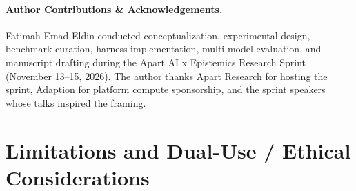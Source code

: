 \documentclass[10pt,a4paper]{article}
\begin{document}
\paragraph{Author Contributions \& Acknowledgements.}
Fatimah Emad Eldin conducted conceptualization, experimental design, benchmark curation, harness implementation, multi-model evaluation, and manuscript drafting during the Apart AI x Epistemics Research Sprint (November 13--15, 2026). The author thanks Apart Research for hosting the sprint, Adaption for platform compute sponsorship, and the sprint speakers whose talks inspired the framing.




\appendix

\section{Limitations and Dual-Use / Ethical Considerations}
\end{document}
